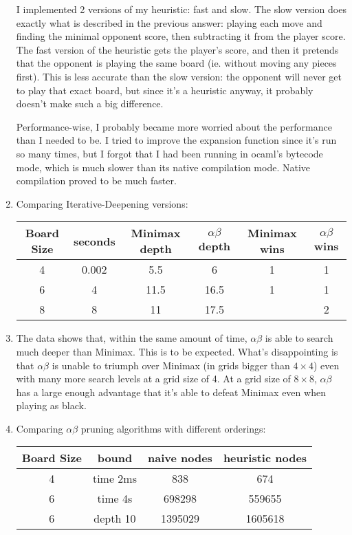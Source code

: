 \documentclass[12pt]{article}
\begin{document}
\begin{enumerate}
	I implemented 2 versions of my heuristic: fast and slow. The slow version does exactly what is described in the previous answer: playing each move and finding the minimal opponent score, then subtracting it from the player score. The fast version of the heuristic gets the player's score, and then it pretends that the opponent is playing the same board (ie. without moving any pieces first). This is less accurate than the slow version: the opponent will never get to play that exact board, but since it's a heuristic anyway, it probably doesn't make such a big difference.

	Performance-wise, I probably became more worried about the performance than I needed to be. I tried to improve the expansion function since it's run so many times, but I forgot that I had been running in ocaml's bytecode mode, which is much slower than its native compilation mode. Native compilation proved to be much faster.

\item Comparing Iterative-Deepening versions:
	 \begin{table}[h]
		 \centering
		 \begin{tabular}{|c|c|c|c|c|c|}
			 \hline
			 Board Size & seconds & Minimax depth & \( \alpha\beta \) depth & Minimax wins & \( \alpha\beta \) wins \\ \hline
			 4 & 0.002 &   5.5   &   6    &    1    &  1      \\ \hline
			 6 & 4     &   11.5  &  16.5  &    1    &  1      \\ \hline
			 8 & 8     &   11    &  17.5    &         &  2      \\ \hline
		\end{tabular}
	\end{table}

\item The data shows that, within the same amount of time, $\alpha\beta$ is able to search much deeper than Minimax. This is to be expected. What's disappointing is that $\alpha\beta$ is unable to triumph over Minimax (in grids bigger than $4\times4$) even with many more search levels at a grid size of 4. At a grid size of $8\times8$, $\alpha\beta$ has a large enough advantage that it's able to defeat Minimax even when playing as black. 

\item Comparing $\alpha\beta$ pruning algorithms with different orderings:
	 \begin{table}[h]
		 \centering
		 \begin{tabular}{|c|c|c|c|}
			 \hline
			 Board Size   & bound   & naive nodes & heuristic nodes \\ \hline
			 4 & time 2ms &   838   &   674   \\ \hline
			 6 & time 4s  & 698298  & 559655  \\ \hline
			 6 & depth 10 & 1395029 & 1605618 \\ \hline
		\end{tabular}
	\end{table}


\end{enumerate}
\end{document}

